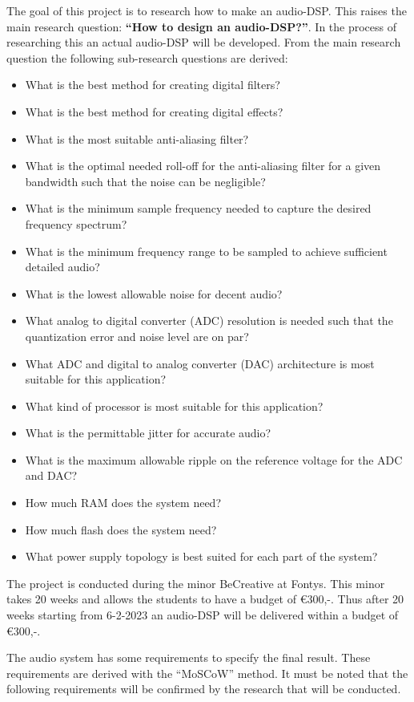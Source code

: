 The goal of this project is to research how to make an audio-DSP. This raises the main research question: \textbf{“How to design an audio-DSP?”}. In the process of researching this an actual audio-DSP will be developed. From the main research question the following sub-research questions are derived:
\begin{itemize} %
	\setlength\itemsep{-0.3em} %
	\item What is the best method for creating digital filters?
	\item What is the best method for creating digital effects?
	\item What is the most suitable anti-aliasing filter?
	\item What is the optimal needed roll-off for the anti-aliasing filter for a given bandwidth such that the noise can be negligible?
	\item What is the minimum sample frequency needed to capture the desired frequency spectrum?
	\item What is the minimum frequency range to be sampled to achieve sufficient detailed audio?
	\item What is the lowest allowable noise for decent audio?
	\item What analog to digital converter (ADC) resolution is needed such that the quantization error and noise level are on par?
	\item What ADC and digital to analog converter (DAC) architecture is most suitable for this application?
	\item What kind of processor is most suitable for this application?
	\item What is the permittable jitter for accurate audio?
	\item What is the maximum allowable ripple on the reference voltage for the ADC and DAC?
	\item How much RAM does the system need?
	\item How much flash does the system need?
	\item What power supply topology is best suited for each part of the system? \\
\end{itemize}

\noindent
The project is conducted during the minor BeCreative at Fontys. This minor takes 20 weeks and allows the students to have a budget of €300,-. Thus after 20 weeks starting from 6-2-2023 an audio-DSP will be delivered within a budget of €300,-.
\par
\noindent
The audio system has some requirements to specify the final result. These requirements are derived with the “MoSCoW” method. It must be noted that the following requirements will be confirmed by the research that will be conducted.

